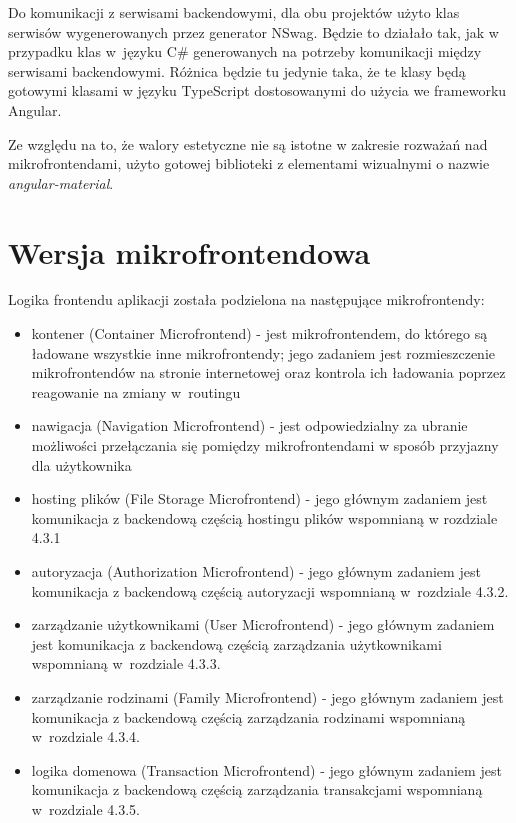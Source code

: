 \documentclass{SGGW-thesis}
\begin{document}
{Do komunikacji z serwisami backendowymi, dla obu projektów użyto klas serwisów wygenerowanych przez generator NSwag. Będzie to działało tak, jak w przypadku klas w~języku C\# generowanych na potrzeby komunikacji między serwisami backendowymi. Różnica będzie tu jedynie taka, że te klasy będą gotowymi klasami w języku TypeScript dostosowanymi do użycia we frameworku Angular.

Ze względu na to, że walory estetyczne nie są istotne w zakresie rozważań nad mikrofrontendami, użyto gotowej biblioteki z elementami wizualnymi o nazwie \textit{angular-material}.

  \section{Wersja mikrofrontendowa}
  Logika frontendu aplikacji została podzielona na następujące mikrofrontendy:

  \begin{itemize}
    \item kontener (Container Microfrontend) - jest mikrofrontendem, do którego są ładowane wszystkie inne mikrofrontendy; jego zadaniem jest rozmieszczenie mikrofrontendów na stronie internetowej oraz kontrola ich ładowania poprzez reagowanie na zmiany w~routingu
    \item nawigacja (Navigation Microfrontend) - jest odpowiedzialny za ubranie możliwości przełączania się pomiędzy mikrofrontendami w sposób przyjazny dla użytkownika
    \item hosting plików (File Storage Microfrontend) - jego głównym zadaniem jest komunikacja z backendową częścią hostingu plików wspomnianą w rozdziale 4.3.1
    \item autoryzacja (Authorization Microfrontend) - jego głównym zadaniem jest komunikacja z backendową częścią autoryzacji wspomnianą w~rozdziale 4.3.2.
    \item zarządzanie użytkownikami (User Microfrontend) - jego głównym zadaniem jest komunikacja z backendową częścią zarządzania użytkownikami wspomnianą w~rozdziale 4.3.3.
    \item zarządzanie rodzinami (Family Microfrontend) - jego głównym zadaniem jest komunikacja z backendową częścią zarządzania rodzinami wspomnianą w~rozdziale 4.3.4.
    \item logika domenowa (Transaction Microfrontend) - jego głównym zadaniem jest komunikacja z backendową częścią zarządzania transakcjami wspomnianą w~rozdziale 4.3.5.
  \end{itemize}

}
\end{document}
